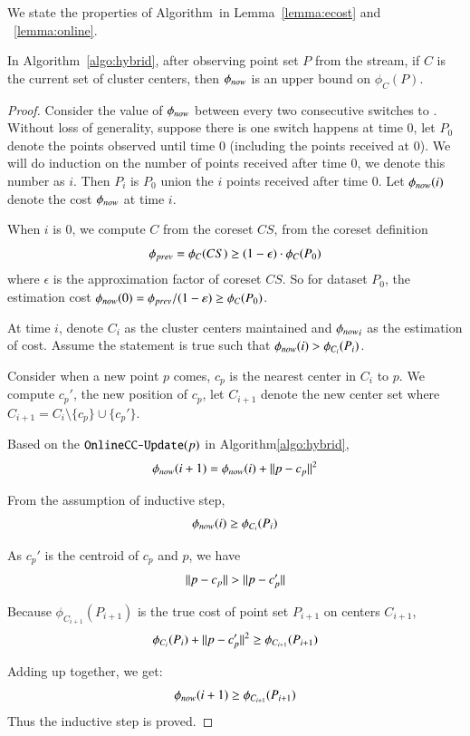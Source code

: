 We state the properties of Algorithm~\hybrid in Lemma~\ref{lemma:ecost} and ~\ref{lemma:online}.
\begin{lemma}
\label{lemma:ecost}
In Algorithm~\ref{algo:hybrid}, after observing point set $P$ from the stream, if $C$ is the current set of cluster centers, then $\texttt{$\phi_{now}$}$ is an upper bound on $\phi_C(P)$.
\end{lemma}
\begin{proof}
Consider the value of $\texttt{$\phi_{now}$}$ between every two consecutive switches to \cc. Without loss of generality, suppose there is one switch happens at time $0$, let $P_0$ denote the points observed until time $0$ (including the points received at $0$). We will do induction on the number of points received after time $0$, we denote this number as $i$. Then $P_i$ is $P_0$ union the $i$ points received after time $0$. Let $\texttt{$\phi_{now}$} (i)$ denote the cost $\texttt{$\phi_{now}$}$ at time $i$. 

When $i$ is $0$, we compute $C$ from the coreset $CS$, from the coreset definition
\[
\texttt{$\phi_{prev}$} = \phi_{C}(CS) \geq (1-\epsilon) \cdot \phi_{C}(P_0)
\] 
where $\epsilon$ is the approximation factor of coreset $CS$. So for dataset $P_0$, 
the estimation cost $\texttt{$\phi_{now}$}(0) = \texttt{$\phi_{prev}$} / (1-\varepsilon) \geq \phi_{C}(P_0)$.

At time $i$, denote $C_i$ as the cluster centers maintained and $\texttt{$\phi_{now}$}_i$ as the estimation of \km cost. Assume the statement is true such that $\texttt{$\phi_{now}$} (i) > \phi_{C_i}(P_i)$. 

Consider when a new point $p$ comes, $c_p$ is the nearest center in $C_i$ to $p$. 
We compute $c_p'$, the new position of $c_p$, let $C_{i+1}$ denote the new center set 
where $C_{i+1}=C_i \setminus \{ c_p \} \cup \{c_p' \}$. 


Based on the $\hybridupdate(p)$ in Algorithm\ref{algo:hybrid}, 
\[
\texttt{$\phi_{now}$} (i+1) = \texttt{$\phi_{now}$} (i) + \Arrowvert {p} - {c_p} \Arrowvert^2
\]

From the assumption of inductive step, 
\[
\texttt{$\phi_{now}$} (i) \geq \phi_{C_i}(P_i)
\]

As $c_p'$ is the centroid of $c_p$ and $p$, we have
\[
\Arrowvert {p} - {c_p} \Arrowvert > \Arrowvert {p} - {c_p'} \Arrowvert 
\]

Because $\phi_{C_{i+1}}(P_{i+1})$ is the true cost of point set $P_{i+1}$ on centers $C_{i+1}$,
\[
\phi_{C_i}(P_i) + \Arrowvert {p} - {c_p'} \Arrowvert^2 \geq \phi_{C_{i+1}}(P_{i+1})
\] 

Adding up together, we get:
\[
\texttt{$\phi_{now}$} (i+1) \geq \phi_{C_{i+1}}(P_{i+1})
\]
Thus the inductive step is proved.
\end{proof}

